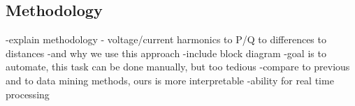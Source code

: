 \documentclass[conference]{IEEEtran}
\begin{document}
\subsection{Methodology}

-explain methodology
	- voltage/current harmonics to P/Q to differences to distances
	-and why we use this approach
	-include block diagram
	-goal is to automate, this task can be done manually, but too tedious
	-compare to previous and to data mining methods, ours is more interpretable
	-ability for real time processing

	




\begin{figure}[!t]
	\centering
	\hfill
\end{figure}
\end{document}
